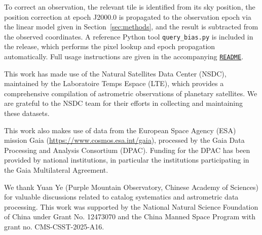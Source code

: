 \documentclass[linenumbers,amsmath,manuscript]{aastex702}
\begin{document}
To correct an observation, the relevant tile is identified from its sky position, the position correction at epoch J2000.0 is propagated to the observation epoch via the linear model given in Section~\ref{sec:methods}, and the result is subtracted from the observed coordinates. A reference Python tool \texttt{query\_bias.py} is included in the release, which performs the pixel lookup and epoch propagation automatically. Full usage instructions are given in the accompanying \href{https://nadc.china-vo.org/res/file_upload/download?id=1109148}{\texttt{README}}.

\clearpage

\onecolumngrid

\begin{acknowledgments}

This work has made use of the Natural Satellites Data Center (NSDC), maintained by the Laboratoire Temps Espace (LTE), which provides a comprehensive compilation of astrometric observations of planetary satellites. We are grateful to the NSDC team for their efforts in collecting and maintaining these datasets.

This work also makes use of data from the European Space Agency (ESA) mission Gaia (\url{https://www.cosmos.esa.int/gaia}), processed by the Gaia Data Processing and Analysis Consortium (DPAC). Funding for the DPAC has been provided by national institutions, in particular the institutions participating in the Gaia Multilateral Agreement.

We thank Yuan Ye (Purple Mountain Observatory, Chinese Academy of Sciences) for valuable discussions related to catalog systematics and astrometric data processing. This work was supported by the National Natural Science Foundation of China under Grant No. 12473070 and the China Manned Space Program with grant no. CMS-CSST-2025-A16.
\end{acknowledgments}

{}


\end{document}
